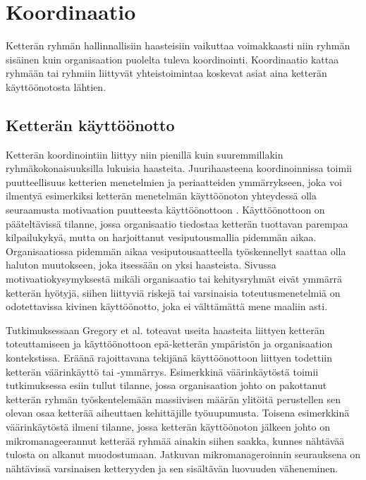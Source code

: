 \chapter{Koordinaatio}

Ketterän ryhmän hallinnallisiin haasteisiin vaikuttaa voimakkaasti niin ryhmän sisäinen kuin organisaation puolelta tuleva koordinointi. Koordinaatio kattaa ryhmään tai ryhmiin liittyvät yhteistoimintaa koskevat asiat aina ketterän käyttöönotosta lähtien.

\section{Ketterän käyttöönotto}

Ketterän koordinointiin liittyy niin pienillä kuin suuremmillakin ryhmäkokonaisuuksilla lukuisia haasteita. Juurihaasteena koordinoinnissa toimii puutteellisuus ketterien menetelmien ja periaatteiden ymmärrykseen, joka voi ilmentyä esimerkiksi ketterän menetelmän käyttöönoton yhteydessä olla seuraamusta motivaation puutteesta käyttöönottoon \cite{GREGORY201692}. Käyttöönottoon on pääteltävissä tilanne, jossa organisaatio tiedostaa ketterän tuottavan parempaa kilpailukykyä, mutta on harjoittanut vesiputousmallia \cite{MCKNIGHT2014168} pidemmän aikaa. Organisaatiossa pidemmän aikaa vesiputousaatteella työskennellyt saattaa olla haluton muutokseen, joka itsessään on yksi haasteista. Sivussa motivaatiokysymyksestä mikäli organisaatio tai kehitysryhmät eivät ymmärrä ketterän hyötyjä, siihen liittyviä riskejä tai varsinaisia toteutusmenetelmiä on odotettavissa kivinen käyttöönotto, joka ei välttämättä mene maaliin asti. 

Tutkimuksessaan Gregory et al. \cite{GREGORY201692} toteavat useita haasteita liittyen ketterän toteuttamiseen ja käyttöönottoon epä-ketterän ympäristön ja organisaation kontekstissa. Eräänä rajoittavana tekijänä käyttöönottoon liittyen todettiin ketterän väärinkäyttö tai -ymmärrys. Esimerkkinä väärinkäytöstä toimii tutkimuksessa esiin tullut tilanne, jossa organisaation johto on pakottanut ketterän ryhmän työskentelemään massiivisen määrän ylitöitä perustellen sen olevan osaa ketterää aiheuttaen kehittäjille työuupumusta. Toisena esimerkkinä väärinkäytöstä ilmeni tilanne, jossa ketterän käyttöönoton jälkeen johto on mikromanageerannut ketterää ryhmää ainakin siihen saakka, kunnes nähtävää tulosta on alkanut muodostumaan. Jatkuvan mikromanageroinnin seurauksena on nähtävissä varsinaisen ketteryyden ja sen sisältävän luovuuden väheneminen.

